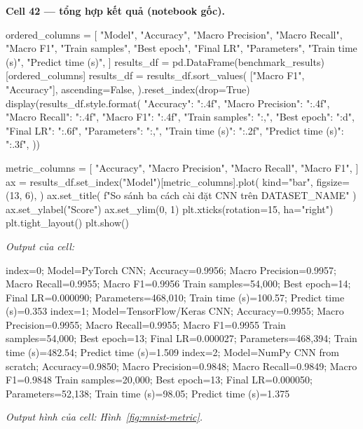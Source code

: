 \documentclass[12pt,a4paper]{report}
\begin{document}
\par\medskip\noindent\textbf{Cell 42 --- tổng hợp kết quả (notebook gốc).}
\begin{NotebookCode}
ordered_columns = [
    "Model",
    "Accuracy",
    "Macro Precision",
    "Macro Recall",
    "Macro F1",
    "Train samples",
    "Best epoch",
    "Final LR",
    "Parameters",
    "Train time (s)",
    "Predict time (s)",
]
results_df = pd.DataFrame(benchmark_results)[ordered_columns]
results_df = results_df.sort_values(
    ["Macro F1", "Accuracy"],
    ascending=False,
).reset_index(drop=True)
display(results_df.style.format({
    "Accuracy": "{:.4f}",
    "Macro Precision": "{:.4f}",
    "Macro Recall": "{:.4f}",
    "Macro F1": "{:.4f}",
    "Train samples": "{:,}",
    "Best epoch": "{:d}",
    "Final LR": "{:.6f}",
    "Parameters": "{:,}",
    "Train time (s)": "{:.2f}",
    "Predict time (s)": "{:.3f}",
}))

metric_columns = [
    "Accuracy",
    "Macro Precision",
    "Macro Recall",
    "Macro F1",
]
ax = results_df.set_index("Model")[metric_columns].plot(
    kind="bar",
    figsize=(13, 6),
)
ax.set_title(
    f"So sánh ba cách cài đặt CNN trên {DATASET_NAME}"
)
ax.set_ylabel("Score")
ax.set_ylim(0, 1)
plt.xticks(rotation=15, ha="right")
plt.tight_layout()
plt.show()
\end{NotebookCode}
\noindent\textit{Output của cell:}
\begin{NotebookOutput}
index=0; Model=PyTorch CNN; Accuracy=0.9956; Macro Precision=0.9957; Macro Recall=0.9955; Macro F1=0.9956
  Train samples=54,000; Best epoch=14; Final LR=0.000090; Parameters=468,010; Train time (s)=100.57; Predict time (s)=0.353
index=1; Model=TensorFlow/Keras CNN; Accuracy=0.9955; Macro Precision=0.9955; Macro Recall=0.9955; Macro F1=0.9955
  Train samples=54,000; Best epoch=13; Final LR=0.000027; Parameters=468,394; Train time (s)=482.54; Predict time (s)=1.509
index=2; Model=NumPy CNN from scratch; Accuracy=0.9850; Macro Precision=0.9848; Macro Recall=0.9849; Macro F1=0.9848
  Train samples=20,000; Best epoch=13; Final LR=0.000050; Parameters=52,138; Train time (s)=98.05; Predict time (s)=1.375
\end{NotebookOutput}
\noindent\textit{Output hình của cell: Hình~\ref{fig:mnist-metric}.}

\begin{table}[htbp]\centering\caption{Ba CNN trên full test set MNIST}\label{tab:mnist-results}
\end{table}
\end{document}
